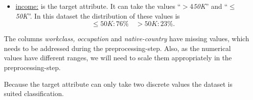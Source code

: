 \documentclass{scrartcl}[a4paper, 11pt]
\begin{document}
\begin{itemize}
        \item \underline{income:} is the target attribute. It can take the values 
        \enquote{$>$4\textit{50K}} and \enquote{\textit{$\leq$50K}}. In this dataset the distribution of these values is 
        $$
            \leq 50K : 76 \% \quad >50K: 23\%.
        $$

    \end{itemize}
    The columns \textit{workclass, occupation} and \textit{native-country} have missing values, which needs to be addressed during the preprocessing-step.
    Also, as the numerical values have different ranges, we will need to scale them appropriately in the preprocessing-step.
    
    Because the target attribute can only take two discrete values the dataset is suited classification.
\end{document}
